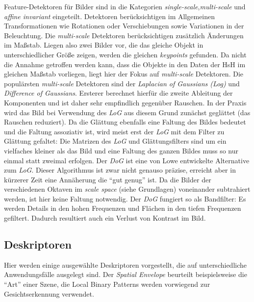 Feature-Detektoren für Bilder sind in die Kategorien \textit{single-scale},\textit{multi-scale} und \textit{affine invariant} eingeteilt. Detektoren berücksichtigen im Allgemeinen Transformationen wie Rotationen oder Verschiebungen sowie Variationen in der Beleuchtung. Die \textit{multi-scale} Detektoren berücksichtigen zusätzlich Änderungen im Maßstab. Liegen also zwei Bilder vor, die das gleiche Objekt in unterschiedlicher Größe zeigen, werden die gleichen \textit{keypoints} gefunden. Da nicht die Annahme getroffen werden kann, dass die Objekte in den Daten der HsH im gleichen Maßstab vorliegen, liegt hier der Fokus auf \textit{multi-scale} Detektoren.\newline
Die populärsten \textit{multi-scale} Detektoren sind der \textit{Laplacian of Gaussians (Log)} und \textit{Difference of Gaussians}. Ersterer berechnet hierfür die zweite Ableitung der Komponenten und ist daher sehr empfindlich gegenüber Rauschen. In der Praxis wird das Bild bei Verwendung des \textit{LoG} aus diesem Grund zunächst geglättet (das Rauschen reduziert). Da die Glättung ebenfalls eine Faltung des Bildes bedeutet und die Faltung assoziativ ist, wird meist erst der \textit{LoG} mit dem Filter zu Glättung gefaltet: Die Matrizen des \textit{LoG} und Glättungsfilters sind um ein vielfaches kleiner als das Bild und eine Faltung des ganzen Bildes muss so nur einmal statt zweimal erfolgen. Der \textit{DoG} ist eine von Lowe entwickelte Alternative zum \textit{LoG}. Dieser Algorithmus ist zwar nicht genauso präzise, erreicht aber in kürzerer Zeit eine Annäherung die \enquote{gut genug} ist. Da die Bilder der verschiedenen Oktaven im \textit{scale space} (siehe Grundlagen) voneinander subtrahiert werden, ist hier keine Faltung notwendig. Der \textit{DoG} fungiert so als Bandfilter: Es werden Details in den hohen Frequenzen und Flächen in den tiefen Frequenzen gefiltert. Dadurch resultiert auch ein Verlust von Kontrast im Bild.

\subsection{Deskriptoren}

Hier werden einige ausgewählte Deskriptoren vorgestellt, die auf unterschiedliche Anwendungsfälle ausgelegt sind. Der \textit{Spatial Envelope} beurteilt beispielsweise die \enquote{Art} einer Szene, die Local Binary Patterns werden vorwiegend zur Gesichtserkennung verwendet. \newline

